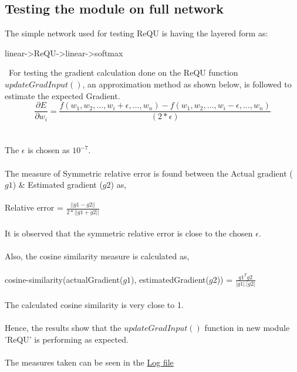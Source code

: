 \documentclass{article}
\begin{document}
	\subsection{Testing the module on full network}
	The simple network used for testing ReQU is having the layered form as:
	\begin{verbatim*}
linear->ReQU->linear->softmax
	\end{verbatim*}
	~\newline For testing the gradient calculation done on the ReQU function
	$updateGradInput()$, an approximation method as shown below, is followed to
	estimate the expected Gradient.
	\begin{equation*} 
	\frac{\partial E}{\partial w_{i}} = \frac{f(w_{1}, w_{2}, \ldots, w_{i} +
	\epsilon, \ldots, w_{n}) - f(w_{1}, w_{2}, \ldots, w_{i} - \epsilon, \ldots,
	w_{n})}{(2*\epsilon)}
	\end{equation*}
	\\\\The $\epsilon$ is chosen as $10^{-7}$.\\\\The
	measure of Symmetric relative error\cite{stmt}\cite{oxford} is found between the Actual gradient ($g1$) \&
	Estimated gradient ($g2$) as,\\\\Relative error = $\frac{||g1 - g2||}{2 *||g1 +
	g2||}$\\\\It is observed that the symmetric
	relative error is close to the chosen $\epsilon$.\\\\Also, the cosine
	similarity measure is calculated as, \\\\ cosine-similarity(actualGradient($g1$), estimatedGradient($g2$)) = $\frac{g1^{T}g2}{|g1|.|g2|}$ \\\\The calculated
	cosine similarity is very close to 1. \\\\Hence, the results show that the
	$updateGradInput()$ function in new module 'ReQU' is performing as expected. \\\\
	The measures taken can be seen in the
	\href{./ReQUlayer/gradientsTest.txt}{Log file}
		
	
	
	
	
\end{document}
